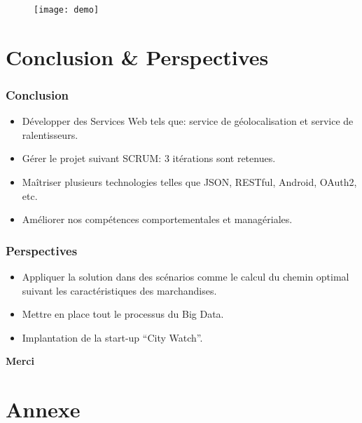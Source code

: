 \documentclass{beamer}
\begin{document}
\begin{frame}
    \begin{center}
    \begin{figure}
        \texttt{[image: demo]}
    \end{figure}
    \end{center}
\end{frame}

\section{Conclusion \& Perspectives}

\begin{frame}
    \frametitle{Conclusion}
    \begin{itemize}
        \item Développer des Services Web tels que: service de géolocalisation et service de ralentisseurs.
        \item Gérer le projet suivant SCRUM: 3 itérations sont retenues.
        \item Maîtriser plusieurs technologies telles que JSON, RESTful, Android, OAuth2, etc.
        \item Améliorer nos compétences comportementales et managériales.
    \end{itemize}
\end{frame}

\begin{frame}
    \frametitle{Perspectives}
    \begin{itemize}
        \item Appliquer la solution dans des scénarios comme le calcul du chemin optimal suivant les caractéristiques des marchandises.
        \item Mettre en place tout le processus du Big Data.
        \item Implantation de la start-up ``City Watch''.
    \end{itemize}
\end{frame}

\begin{frame}
    \begin{center}
        \bfseries \Huge
        Merci
    \end{center}
\end{frame}

\section*{Annexe}
\end{document}
